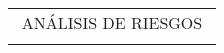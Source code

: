 \begin{adjustbox}{angle=90, captionbelow={DFMEA.}, float={table}[H]}


\setlength\arrayrulewidth{0.5pt}
\centering
\begin{tabular}{|ccccccccllllc|}
\hline
\multicolumn{13}{|c|}{ANÁLISIS DE RIESGOS}                                                                                                                                                                                                                                                                                                                                                                                                                                                                                                                                                                                                                                                                                                                                                                                                                                                                                                        \\
\multicolumn{1}{|l}{}                                           & \multicolumn{1}{l}{}                                                                                                   & \multicolumn{1}{l}{}                                                                                                   & \multicolumn{1}{l}{}                                                                                                     & \multicolumn{1}{l}{}                         & \multicolumn{1}{l}{}                         & \multicolumn{1}{l}{}                         & \multicolumn{1}{l}{}                            &                                                                                                                           &                                              &                                              &                                              & \multicolumn{1}{l|}{}      \\ \cline{2-8}

\end{tabular}
\end{adjustbox}
